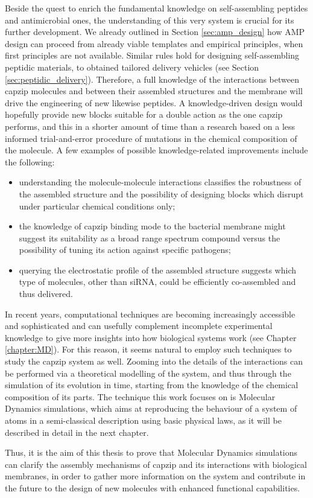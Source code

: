 Beside the quest to enrich the fundamental knowledge on self-assembling peptides and antimicrobial ones, the understanding of this very system is crucial for its further development. We already outlined in Section \ref{sec:amp_design} how AMP design can proceed from already viable templates and empirical principles, when first principles are not available. Similar rules hold for designing self-assembling peptidic materials, to obtained tailored delivery vehicles (see Section \ref{sec:peptidic_delivery}).
%
Therefore, a full knowledge of the interactions between capzip molecules and between their assembled structures and the membrane will drive the engineering of new likewise peptides. A knowledge-driven design would hopefully provide new blocks suitable for a double action as the one capzip performs, and this in a shorter amount of time than a research based on a less informed trial-and-error procedure of mutations in the chemical composition of the molecule. A few examples of possible knowledge-related improvements include the following:
\begin{itemize}
\item understanding the molecule-molecule interactions classifies the robustness of the assembled structure and the possibility of designing blocks which disrupt under particular chemical conditions only;
\item the knowledge of capzip binding mode to the bacterial membrane might suggest its suitability as a broad range spectrum compound versus the possibility of tuning its action against specific pathogens;
\item querying the electrostatic profile of the assembled structure suggests which type of molecules, other than siRNA, could be efficiently co-assembled and thus delivered.
\end{itemize}

In recent years, computational techniques are becoming increasingly accessible and sophisticated and can usefully complement incomplete experimental knowledge to give more insights into how biological systems work (see Chapter \ref{chapter:MD}). For this reason, it seems natural to employ such techniques to study the capzip system as well. Zooming into the details of the interactions can be performed via a theoretical modelling of the system, and thus through the simulation of its evolution in time, starting from the knowledge of the chemical composition of its parts. The technique this work focuses on is Molecular Dynamics simulations, which aims at reproducing the behaviour of a system of atoms in a semi-classical description using basic physical laws, as it will be described in detail in the next chapter.

Thus, it is the aim of this thesis to prove that Molecular Dynamics simulations can clarify the assembly mechanisms of capzip and its interactions with biological membranes, in order to gather more information on the system and contribute in the future to the design of new molecules with enhanced functional capabilities.
